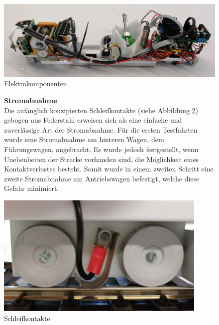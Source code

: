 \documentclass[../../main.tex]{subfiles}
\begin{document}
\begin{figure}[H]
  \centering
  \includegraphics[width=1\textwidth]{lokomotive3.PNG}
  \caption {Elektrokomponenten}
  \label{fig:elektrokomponenten}
\end{figure}

\begin{figure}[H]
  \begin{minipage}{.5\textwidth}
    \textbf{Stromabnahme}\\
    Die anfänglich konzipierten Schleifkontakte (siehe Abbildung \ref{fig:schleifkontakte}) gebogen aus Federstahl erweisen sich als eine einfache und zuverlässige Art der Stromabnahme. Für die ersten Testfahrten wurde eine Stromabnahme am hinteren Wagen, dem Führungswagen, angebracht. Es wurde jedoch festgestellt, wenn Unebenheiten der Strecke vorhanden sind, die Möglichkeit eines Kontaktverlustes besteht. Somit wurde in einem zweiten Schritt eine zweite Stromabnahme am Antriebswagen befestigt, welche diese Gefahr minimiert.\\
   \end{minipage}
  \begin{minipage}{.5\textwidth}
    \flushright
    \includegraphics[width=0.9\textwidth]{schleifkontakt.PNG}
    \caption {Schleifkontakte}
    \label{fig:schleifkontakte}
    \end{minipage} 
\end{figure} 
\end{document}
